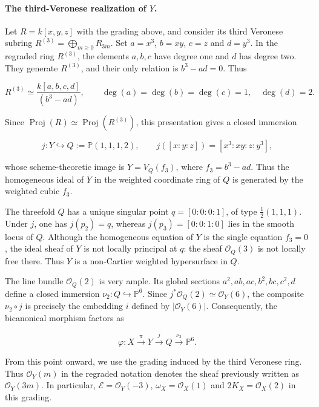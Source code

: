 \documentclass[11pt,twoside]{amsart}
\theoremstyle{plain}
\numberwithin{equation}{section}
\theoremstyle{definition}
\begin{document}
\paragraph{The third-Veronese realization of $Y$.}

Let $R=k[x,y,z]$ with the grading above, and consider its third Veronese subring $R^{(3)}=\bigoplus_{m\geq 0}R_{3m}$. Set $a=x^3$, $b=xy$, $c=z$ and $d=y^3$. In the regraded ring $R^{(3)}$, the elements $a,b,c$ have degree one and $d$ has degree two. They generate $R^{(3)}$, and their only relation is $b^3-ad=0$. Thus

$$
R^{(3)}
\simeq
\frac{k[a,b,c,d]}{(b^3-ad)},
\qquad
\deg(a)=\deg(b)=\deg(c)=1,\quad \deg(d)=2.
$$

Since $\operatorname{Proj}(R)\simeq\operatorname{Proj}(R^{(3)})$, this presentation gives a closed immersion

$$
j:Y\hookrightarrow Q:=\mathbb P(1,1,1,2),
\qquad
j([x:y:z])=[x^3:xy:z:y^3],
$$

whose scheme-theoretic image is $Y=V_Q(f_3)$, where $f_3=b^3-ad$. Thus the homogeneous ideal of $Y$ in the weighted coordinate ring of $Q$ is generated by the weighted cubic $f_3$.

The threefold $Q$ has a unique singular point $q=[0:0:0:1]$, of type $\frac{1}{2}(1,1,1)$. Under $j$, one has $j(p_2)=q$, whereas $j(p_3)=[0:0:1:0]$ lies in the smooth locus of $Q$. Although the homogeneous equation of $Y$ is the single equation $f_3=0$, the ideal sheaf of $Y$ is not locally principal at $q$: the sheaf $\mathcal O_Q(3)$ is not locally free there. Thus $Y$ is a non-Cartier weighted hypersurface in $Q$.

The line bundle $\mathcal O_Q(2)$ is very ample. Its global sections $a^2,ab,ac,b^2,bc,c^2,d$ define a closed immersion $\nu_2:Q\hookrightarrow\mathbb P^6$. Since $j^*\mathcal O_Q(2)\simeq\mathcal O_Y(6)$, the composite $\nu_2\circ j$ is precisely the embedding $i$ defined by $|\mathcal O_Y(6)|$. Consequently, the bicanonical morphism factors as

$$
\varphi:X\xrightarrow{\ \pi\ }Y
\xrightarrow{\ j\ }Q
\xrightarrow{\ \nu_2\ }\mathbb P^6.
$$

From this point onward, we use the grading induced by the third Veronese ring. Thus $\mathcal O_Y(m)$ in the regraded notation denotes the sheaf previously written as $\mathcal O_Y(3m)$. In particular, $\mathcal E=\mathcal O_Y(-3)$, $\omega_X=\mathcal O_X(1)$ and $2K_X=\mathcal O_X(2)$ in this grading.
\end{document}
